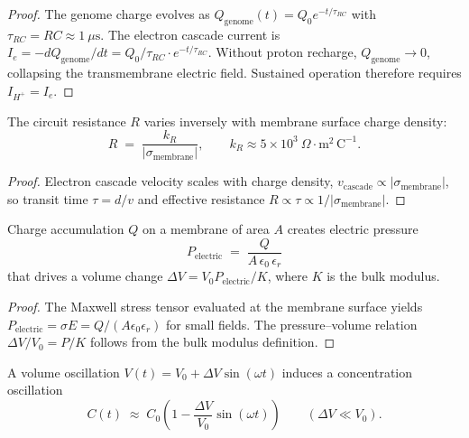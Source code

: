 \begin{proof}
The genome charge evolves as $Q_\mathrm{genome}(t)=Q_0 e^{-t/\tau_{RC}}$ with
$\tau_{RC}=RC\approx 1~\mu\mathrm{s}$.  The electron cascade current is
$I_e=-dQ_\mathrm{genome}/dt=Q_0/\tau_{RC}\cdot e^{-t/\tau_{RC}}$.  Without
proton recharge, $Q_\mathrm{genome}\to 0$, collapsing the transmembrane
electric field.  Sustained operation therefore requires $I_{H^+}=I_e$.
\end{proof}

\begin{theorem}
\label{thm:ch03-resistance-charge}
The circuit resistance $R$ varies inversely with membrane surface charge density:
\begin{equation}
    R \;=\; \frac{k_R}{|\sigma_\mathrm{membrane}|},
    \qquad
    k_R \approx 5\times10^3~\Omega\cdot\mathrm{m}^2\,\mathrm{C}^{-1}.
    \label{eq:ch03-resistance-charge}
\end{equation}
\end{theorem}

\begin{proof}
Electron cascade velocity scales with charge density,
$v_\mathrm{cascade}\propto|\sigma_\mathrm{membrane}|$, so transit time
$\tau=d/v$ and effective resistance $R\propto\tau\propto 1/|\sigma_\mathrm{membrane}|$.
\end{proof}

\begin{theorem}
\label{thm:ch03-charge-geometry}
Charge accumulation $Q$ on a membrane of area $A$ creates electric pressure
\begin{equation}
    P_\mathrm{electric} \;=\; \frac{Q}{A\,\epsilon_0\,\epsilon_r}
\end{equation}
that drives a volume change $\Delta V = V_0 P_\mathrm{electric}/K$, where
$K$ is the bulk modulus.
\end{theorem}

\begin{proof}
The Maxwell stress tensor evaluated at the membrane surface yields
$P_\mathrm{electric} = \sigma E = Q/(A\epsilon_0\epsilon_r)$ for small fields.
The pressure--volume relation $\Delta V/V_0 = P/K$ follows from the bulk modulus
definition.
\end{proof}

\begin{theorem}
\label{thm:ch03-vol-conc}
A volume oscillation $V(t)=V_0+\Delta V\sin(\omega t)$ induces a concentration
oscillation
\begin{equation}
    C(t) \;\approx\; C_0\!\left(1 - \frac{\Delta V}{V_0}\sin(\omega t)\right)
    \qquad (\Delta V \ll V_0).
    \label{eq:ch03-vol-conc}
\end{equation}
\end{theorem}

